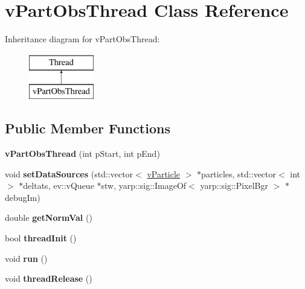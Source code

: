 \hypertarget{classvPartObsThread}{}\section{v\+Part\+Obs\+Thread Class Reference}
\label{classvPartObsThread}
Inheritance diagram for v\+Part\+Obs\+Thread\+:\begin{figure}[H]
\begin{center}
\leavevmode
\includegraphics[height=2.000000cm]{classvPartObsThread}
\end{center}
\end{figure}
\subsection*{Public Member Functions}
\begin{DoxyCompactItemize}
\item 
{\bfseries v\+Part\+Obs\+Thread} (int p\+Start, int p\+End)\hypertarget{classvPartObsThread_ad5ee91bcd5ace1cac76ac13843597d3d}{}\label{classvPartObsThread_ad5ee91bcd5ace1cac76ac13843597d3d}

\item 
void {\bfseries set\+Data\+Sources} (std\+::vector$<$ \hyperlink{classvParticle}{v\+Particle} $>$ $\ast$particles, std\+::vector$<$ int $>$ $\ast$deltats, ev\+::v\+Queue $\ast$stw, yarp\+::sig\+::\+Image\+Of$<$ yarp\+::sig\+::\+Pixel\+Bgr $>$ $\ast$debug\+Im)\hypertarget{classvPartObsThread_a2e85818df4f193da2b0e616e0067bcb2}{}\label{classvPartObsThread_a2e85818df4f193da2b0e616e0067bcb2}

\item 
double {\bfseries get\+Norm\+Val} ()\hypertarget{classvPartObsThread_a2bc5cbff69dd31bd7b571579d6b34930}{}\label{classvPartObsThread_a2bc5cbff69dd31bd7b571579d6b34930}

\item 
bool {\bfseries thread\+Init} ()\hypertarget{classvPartObsThread_a5814f390e326d1bd4cfa82e34855d3d4}{}\label{classvPartObsThread_a5814f390e326d1bd4cfa82e34855d3d4}

\item 
void {\bfseries run} ()\hypertarget{classvPartObsThread_ae261ba48ff6af1ad105adc5ed8fd5373}{}\label{classvPartObsThread_ae261ba48ff6af1ad105adc5ed8fd5373}

\item 
void {\bfseries thread\+Release} ()\hypertarget{classvPartObsThread_a080024e2fc09ae2e3ca16b686d9a2791}{}\label{classvPartObsThread_a080024e2fc09ae2e3ca16b686d9a2791}

\end{DoxyCompactItemize}


